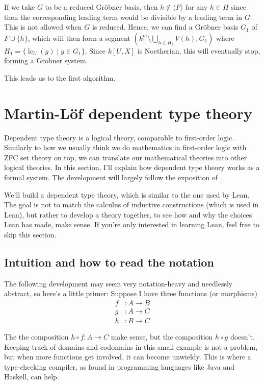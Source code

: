 \documentclass[a4paper, 12pt]{article}
\DeclareMathOperator{\LC}{lc}
\theoremstyle{changedot}
\theoremstyle{changedotbreak}
\theoremstyle{nonumberplain}
\begin{document}
If we take $G$ to be a reduced Gröbner basis, then $h \notin \langle F \rangle$ for any $h \in H$ since then the corresponding leading term would be divisible by a leading term in $G$. This is not allowed when $G$ is reduced. Hence, we can find a Gröbner basis $G_{1}$ of $F \cup \{h\}$, which will then form a segment $(k_{1}^{m} \setminus \bigcup_{h \in H_{1}} V(h), G_{1})$ where $H_{1} = \{\LC_{U}(g) \mid g \in G_{1}\}$. Since $k[U, X]$ is Noetherian, this will eventually stop, forming a Gröbner system.

This leads us to the first algorithm.


\section{Martin-Löf dependent type theory}\label{sec:tt}
Dependent type theory is a logical theory, comparable to first-order logic. Similarly to how we usually think we do mathematics in first-order logic with ZFC set theory on top, we can translate our mathematical theories into other logical theories. In this section, I'll explain how dependent type theory works as a formal system. The development will largely follow the exposition of \cite{rijke2022introduction}.

We'll build a dependent type theory, which is similar to the one used by Lean. The goal is not to match the calculus of inductive constructions (which is used in Lean), but rather to develop a theory together, to see how and why the choices Lean has made, make sense. If you're only interested in learning Lean, feel free to skip this section.

\subsection{Intuition and how to read the notation}
The following development may seem very notation-heavy and needlessly abstract, so here's a little primer: Suppose I have three functions (or morphisms)
\begin{align*}
  f &: A \to B \\
  g &: A \to C \\
  h &: B \to C
\end{align*}

The the composition $h \circ f : A \to C$ make sense, but the composition $h \circ g$ doesn't. Keeping track of domains and codomains in this small example is not a problem, but when more functions get involved, it can become unwieldy. This is where a type-checking compiler, as found in programming languages like Java and Haskell, can help.
\end{document}
